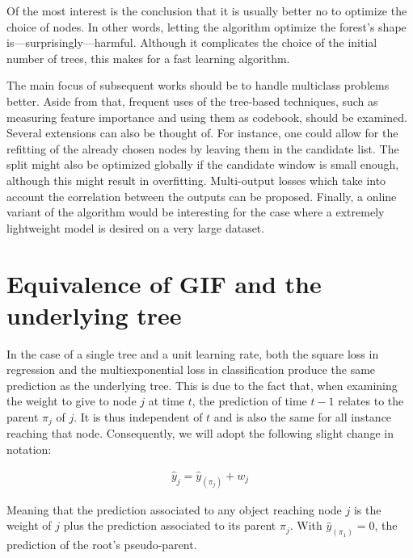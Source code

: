\documentclass{article}
\begin{document}
Of the most interest is the conclusion that it is usually better no to optimize 
the choice of nodes. In other words, letting the algorithm optimize the 
forest's shape is---surprisingly---harmful. Although it complicates the choice 
of the initial number of trees, this makes for a fast learning algorithm.

The main focus of subsequent works should be to handle multiclass problems 
better. Aside from that, frequent uses of the tree-based techniques, such as 
measuring feature importance and using them as codebook, should be examined. 
Several extensions can also be thought of. For instance, one could allow for 
the refitting of the already chosen nodes by leaving them in the candidate 
list. The split might also be optimized globally if the candidate window is 
small enough, although this might result in overfitting. Multi-output losses 
which take into account the correlation between the outputs can be proposed. 
Finally, a online variant of the algorithm would be interesting for the case 
where a extremely lightweight model is desired on a very large dataset.













\appendix
\section{Equivalence of GIF and the underlying tree}\label{app:Equiv}
In the case of a single tree and a unit learning rate, both the square loss in 
regression and the multiexponential loss in classification produce the same 
prediction as the underlying tree. 
This is due to the fact that, when examining the weight to give to node $j$ at 
time $t$, the prediction of time $t-1$ relates to the parent $\pi_j$ of $j$. It 
is thus independent of $t$ and is also the same for all instance reaching that 
node. Consequently, we will adopt the following slight change in notation:

\vspace*{-\baselineskip}
\begin{align}
\hat{y}_j = \hat{y}_{(\pi_j)} + w_j
\end{align}
\vspace*{-\baselineskip}

Meaning that the prediction associated to any object reaching node $j$ is the 
weight of $j$ plus the prediction associated to its parent $\pi_j$. With 
$\hat{y}_{(\pi_1)} = 0$, the prediction of the root's pseudo-parent.
\end{document}
